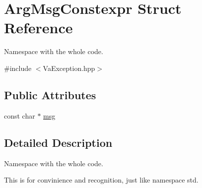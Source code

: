 \hypertarget{struct_arg_msg_constexpr}{}\section{Arg\+Msg\+Constexpr Struct Reference}
\label{struct_arg_msg_constexpr}


Namespace with the whole code.  




{\ttfamily \#include $<$Va\+Exception.\+hpp$>$}

\subsection*{Public Attributes}
\begin{DoxyCompactItemize}
\item 
const char $\ast$ \hyperlink{struct_arg_msg_constexpr_af23e14892351bf00276664bcc5e401c0}{msg}
\end{DoxyCompactItemize}


\subsection{Detailed Description}
Namespace with the whole code. 

This is for convinience and recognition, just like namespace std.


